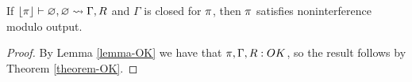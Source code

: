 \begin{theorem}
  \label{theorem-sty}
  If $\lfloor \pi \rfloor \vdash \varnothing,\varnothing \leadsto \Gamma,R$ and $\Gamma$ is closed
  for $\pi$, then $\pi$ satisfies noninterference modulo output. 
\end{theorem}

\begin{proof}
  By Lemma \ref{lemma-OK} we have that $\pi,\Gamma,R : {OK}$, so the result follows
  by Theorem \ref{theorem-OK}.
\end{proof}

